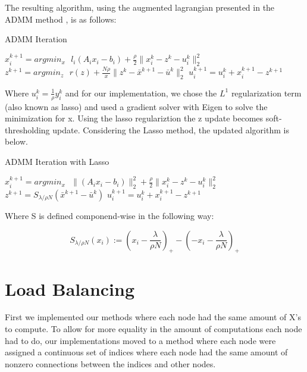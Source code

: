 \documentclass[letterpaper,12pt,onecolumn]{article}
\begin{document}
The resulting algorithm, using the augmented lagrangian presented in the ADMM method \cite{ADMM}, is as follows:

\begin{center}
\begin{algorithm}
\caption{ADMM Iteration}
\begin{algorithmic}[1]
	\STATE $x_{i}^{k+1} = argmin_{x} \: \: \: l_{i}(A_{i}x_{i} - b_{i}) + \frac{\rho}{2} \| x_{i}^{k} - z^{k} - u_{i}^{k} \|_{2}^{2}$ 
	\STATE $z^{k+1} = argmin_{z} \: \: \: r(z) + \frac{N \rho}{x} \| z^{k} - \bar{x}^{k+1} - \bar{u}^{k} \|_{2}^{2} $
	\STATE $u_{i}^{k+1} = u_{i}^{k} + x_{i}^{k+1} - z^{k+1} $ 
  \end{algorithmic}
\end{algorithm}
\end{center}

Where $u_{i}^{k} = \frac{1}{\rho} y_{i}^{k}$ and for our implementation, we chose the $L^{1}$ regularization term (also known as lasso) and used a gradient solver with Eigen to solve the minimization for x. Using the lasso regulariztion the z update becomes soft-thresholding update. Considering the Lasso method, the updated algorithm is below.

\begin{center}
\begin{algorithm}
\caption{ADMM Iteration with Lasso}
\begin{algorithmic}[1]
  \STATE $x_{i}^{k+1} = argmin_{x} \: \: \: \|(A_{i}x_{i} - b_{i})\|_{2}^{2} + \frac{\rho}{2} \| x_{i}^{k} - z^{k} - u_{i}^{k} \|_{2}^{2}$ 
  \STATE $z^{k+1} = S_{\lambda/\rho N} (\bar{x}^{k+1} - \bar{u}^{k})$
	\STATE $u_{i}^{k+1} = u_{i}^{k} + x_{i}^{k+1} - z^{k+1} $ 
  \end{algorithmic}
\end{algorithm}
\end{center}

Where S is defined componend-wise in the following way:
\begin{center}
	\begin{equation}
	  S_{\lambda/\rho N}(x_{i}) := (x_{i} - \frac{\lambda}{\rho N})_{+} - (-x_{i} - \frac{\lambda}{\rho N})_{+}
	\end{equation}
\end{center}

\section{Load Balancing}
First we implemented our methods where each node had the same amount of X's to compute. To allow for more equality in the amount of computations each node had to do, our implementations moved to a method where each node were assigned a continuous set of indices where each node had the same amount of nonzero connections between the indices and other nodes. 
\end{document}
